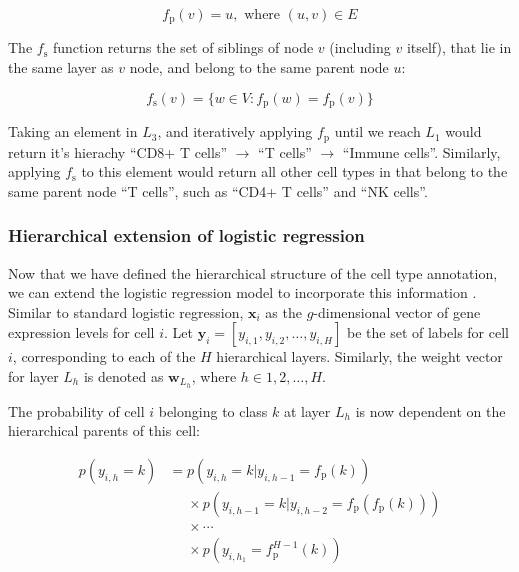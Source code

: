 \begin{equation}
    f_{\text{p}}(v) = u, \text{ where } (u, v) \in E
\end{equation}

The $f_{\text{s}}$ function  returns the set of siblings of node $v$ (including $v$ itself), that lie in the same layer as $v$ node, and belong to the same parent node $u$:

\begin{equation}
    f_{\text{s}}(v) = \{w \in V : f_{\text{p}}(w) = f_{\text{p}}(v)\}
\end{equation}

Taking an element in $L_3$, and iteratively applying $f_{\text{p}}$ until we reach $L_1$  would return it's hierachy ``CD8+ T cells'' $\rightarrow$ ``T cells'' $\rightarrow$ ``Immune cells''. Similarly, applying $f_{\text{s}}$ to this element would return all other cell types in that belong to the same parent node ``T cells'', such as ``CD4+ T cells'' and ``NK cells''.

\subsubsection*{Hierarchical extension of logistic regression}

Now that we have defined the hierarchical structure of the cell type annotation, we can extend the logistic regression model to incorporate this information . Similar to standard logistic regression, $\mathbf{x}_i$ as the $g$-dimensional vector of gene expression levels for cell $i$. Let $\mathbf{y}_i = [y_{i,1}, y_{i,2}, \ldots, y_{i,H}]$ be the set of labels for cell $i$, corresponding to each of the $H$ hierarchical layers. Similarly, the weight vector for layer $L_h$ is denoted as $\mathbf{w}_{L_h}$, where $h \in {1, 2, \ldots, H}$.

The probability of cell $i$ belonging to class $k$ at layer $L_h$ is now dependent on the hierarchical parents of this cell:

\begin{equation}
    \begin{aligned}
    p(y_{i,h} = k) &= p(y_{i,h} = k | y_{i,h-1} = f_{\text{p}}(k)) \\
    &\phantom{=} \times p(y_{i,h-1} = k | y_{i,h-2} = f_{\text{p}}(f_{\text{p}}(k))) \\
    &\phantom{=} \times \cdots \\
    &\phantom{=} \times p(y_{i,h_1} = f_{\text{p}}^{H-1}(k))
    \end{aligned}
\end{equation}

